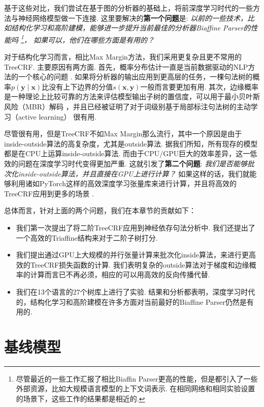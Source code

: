 基于这些对比，我们尝试在基于图的分析器的基础上，将前深度学习时代的一些方法与神经网络模型做一下连接.
这里要解决的\textbf{第一个问题}是:
\emph{
  以前的一些技术，比如结构化学习和高阶建模，能够进一步提升当前最佳的分析器Biaffine Parser的性能吗
  \footnote{
    尽管最近的一些工作汇报了相比Biaffin Parser更高的性能，但是都引入了一些外部资源，比如大规模语言模型的上下文词表示. 在相同网络和相同实验设置的场景下，这些工作的结果都是相近的.
  }，
  如果可以，他们在哪些方面是有用的？
}

对于结构化学习而言，相比Max Margin方法，我们采用更复杂且更不常用的TreeCRF.
主要原因有两方面.
首先，概率分布估计一直是当前数据驱动的NLP方法的一个核心的问题 \citep{le-zuidema-2014-inside}.
如果将分析器的输出应用到更高层的任务，一棵句法树的概率$p(\boldsymbol{y}\mid\boldsymbol{x})$比没有上下边界的分值$s (\boldsymbol{x},\boldsymbol{y})$一般而言要更加有用.
其次，边缘概率是一种理论上比较可靠的方法来评估模型输出子树的置信度，可以用于最小贝叶斯风险（MBR）解码 \citep{smith-smith-2007-probabilistic}，并且已经被证明了对于词级别基于局部标注句法树的主动学习（active learning） \citep{li-etal-2016-active}很有用.

尽管很有用，但是TreeCRF不如Max Margin那么流行，其中一个原因是由于inside-outside算法的高复杂度，尤其是outside算法.
据我们所知，所有现存的模型都是在CPU上运算inside-outside算法.
而由于CPU/GPU巨大的效率差异，这一低效的问题在深度学习时代变得更加严重.
这就引发了\textbf{第二个问题}:
\emph{我们是否能够批次化inside-outside算法，并且直接在GPU上进行计算？}
如果这样的话，我们就能够利用诸如PyTorch这样的高效深度学习张量库来进行计算，并且将高效的TreeCRF应用到更多的场景 \citep{cai-etal-2017-crf,le-zuidema-2014-inside}.

总体而言，针对上面的两个问题，我们在本章节的贡献如下：
\begin{itemize}%
  \item 我们第一次提出了将二阶TreeCRF应用到神经依存句法分析中.
        我们还提出了一个高效的Triaffine结构来对于二阶子树打分.
  \item 我们提出通过GPU上大规模的并行张量计算来批次化inside算法，来进行更高效的TreeCRF损失函数的计算.
        我们表明复杂的outside算法对于梯度和边缘概率的计算而言已不再必须，相应的可以用高效的反向传播代替.
  \item 我们在13个语言的27个树库上进行了实验.
        结果和分析都表明，深度学习时代的，结构化学习和高阶建模在许多方面对当前最好的Biaffine Parser仍然是有用的.
\end{itemize}

\section{基线模型}
\label{sec:dep-basic-model}

